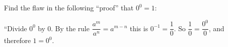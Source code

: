 Find the flaw in the following ``proof'' that $0^0=1$:

``Divide $0^0$ by $0$. By the rule $\dfrac{a^m}{a^n}=a^{m-n}$ this is $0^{-1}=\dfrac{1}{0}$. So $\dfrac{1}{0}=\dfrac{0^0}{0}$, and therefore $1=0^0$.
